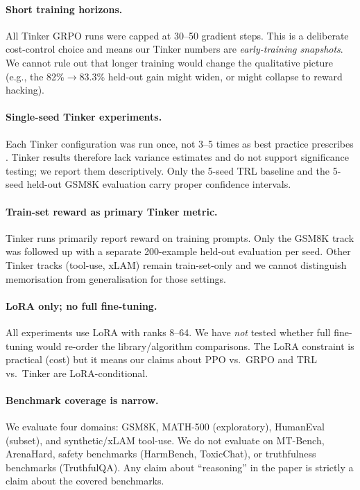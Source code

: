 \paragraph{Short training horizons.}
All Tinker GRPO runs were capped at 30--50 gradient steps. This is a
deliberate cost-control choice and means our Tinker numbers are
\emph{early-training snapshots}. We cannot rule out that longer training
would change the qualitative picture (e.g., the 82\%$\to$83.3\% held-out
gain might widen, or might collapse to reward hacking).

\paragraph{Single-seed Tinker experiments.}
Each Tinker configuration was run once, not 3--5 times as best practice
prescribes \cite{henderson2018deep}. Tinker results therefore lack
variance estimates and do not support significance testing; we report
them descriptively. Only the 5-seed TRL baseline and the 5-seed held-out
GSM8K evaluation carry proper confidence intervals.

\paragraph{Train-set reward as primary Tinker metric.}
Tinker runs primarily report reward on training prompts. Only the GSM8K
track was followed up with a separate 200-example held-out evaluation
per seed. Other Tinker tracks (tool-use, xLAM) remain train-set-only and
we cannot distinguish memorisation from generalisation for those
settings.

\paragraph{LoRA only; no full fine-tuning.}
All experiments use LoRA \cite{hu2022lora} with ranks 8--64. We have
\emph{not} tested whether full fine-tuning would re-order the
library/algorithm comparisons. The LoRA constraint is practical (cost) but
it means our claims about PPO vs.\ GRPO and TRL vs.\ Tinker are
LoRA-conditional.

\paragraph{Benchmark coverage is narrow.}
We evaluate four domains: GSM8K, MATH-500 (exploratory), HumanEval
(subset), and synthetic/xLAM tool-use. We do not evaluate on MT-Bench,
ArenaHard, safety benchmarks (HarmBench, ToxicChat), or truthfulness
benchmarks (TruthfulQA). Any claim about ``reasoning'' in the paper is
strictly a claim about the covered benchmarks.

